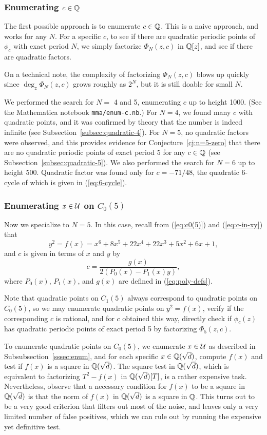 \subsubsection{Enumerating $c \in \mathbb{Q}$}

The first possible approach is to enumerate $c \in \mathbb{Q}$. This is a
naive approach, and works for any $N$. For a specific $c$, to see if
there are quadratic periodic points of $\phi_c$ with exact period $N$,
we simply factorize $\Phi_N(z, c)$ in $\mathbb{Q}[z]$, and see if there are
quadratic factors.

On a technical note, the complexity of factorizing $\Phi_N(z, c)$
blows up quickly since $\deg_z \Phi_N(z, c)$ grows roughly as $2^N$,
but it is still doable for small $N$.

We performed the search for $N =$ 4 and 5, enumerating $c$ up to
height 1000. (See the Mathematica notebook \texttt{mma/enum-c.nb}.)
For $N = 4$, we found many $c$ with quadratic points, and it was
confirmed by theory that the number is indeed infinite (see
Subsection~\ref{subsec:quadratic-4}). For $N=5$, no quadratic factors
were observed, and this provides evidence for
Conjecture~\ref{cj:n=5-zero} that there are no quadratic periodic
points of exact period 5 for any $c \in \mathbb{Q}$ (see
Subsection~\ref{subsec:quadratic-5}). We also performed the search for
$N = 6$ up to height 500. Quadratic factor was found only for $c =
-71/48$, the quadratic 6-cycle of which is given in
(\ref{eq:6-cycle}).

\subsubsection{Enumerating $x \in \mathcal{U}$ on $C_0(5)$}

Now we specialize to $N = 5$. In this case, recall from
(\ref{eq:c0(5)}) and (\ref{eq:c-in-xy}) that
\[
y^2 = f(x) = x^6 + 8x^5 + 22x^4 + 22x^3 + 5x^2 + 6x + 1,
\]
and $c$ is given in terms of $x$ and $y$ by
\[
c = \frac{g(x)}{2(P_0(x) - P_1(x) y)},
\]
where $P_0(x)$, $P_1(x)$, and $g(x)$ are defined in
(\ref{eq:poly-defs}).

Note that quadratic points on $C_1(5)$ always correspond to quadratic
points on $C_0(5)$, so we may enumerate quadratic points on $y^2 =
f(x)$, verify if the corresponding $c$ is rational, and for $c$
obtained this way, directly check if $\phi_c(z)$ has quadratic
periodic points of exact period 5 by factorizing $\Phi_5(z, c)$.

To enumerate quadratic points on $C_0(5)$, we enumerate $x \in \mathcal{U}$ as
described in Subsubsection~\ref{sssec:enum}, and for each specific $x
\in \mathbb{Q}(\sqrt{d})$, compute $f(x)$ and test if $f(x)$ is a square in
$\mathbb{Q}(\sqrt{d})$. The square test in $\mathbb{Q}(\sqrt{d})$, which is equivalent
to factorizing $T^2 - f(x)$ in $\mathbb{Q}(\sqrt{d})[T]$, is a rather
expensive task. Nevertheless, observe that a necessary condition for
$f(x)$ to be a square in $\mathbb{Q}(\sqrt{d})$ is that the norm of $f(x)$ in
$\mathbb{Q}(\sqrt{d})$ is a square in $\mathbb{Q}$. This turns out to be a very good
criterion that filters out most of the noise, and leaves only a very
limited number of false positives, which we can rule out by running
the expensive yet definitive test.


